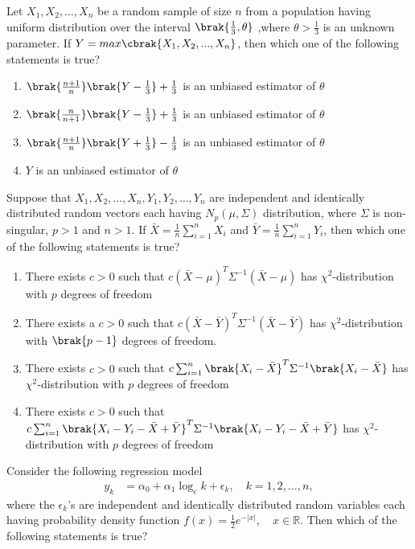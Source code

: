 \item Let $X_1, X_2, \ldots, X_n$ be a random sample of size $n$ from a population having uniform distribution over the interval $\brak{\frac{1}{3},\theta}$ ,where $\theta > \frac{1}{3}$ is an unknown parameter. If $Y = max\cbrak{X_1,X_2,...,X_n}$, then which one of the following statements is true?

\begin{enumerate}
    \item $\brak{\frac{n+1}{n}}\brak{Y-\frac{1}{3}} + \frac{1}{3}$ is an unbiased estimator of $\theta$
    \item $\brak{\frac{n}{n+1}}\brak{Y-\frac{1}{3}} + \frac{1}{3}$ is an unbiased estimator of $\theta$
    \item $\brak{\frac{n+1}{n}}\brak{Y+\frac{1}{3}} - \frac{1}{3}$ is an unbiased estimator of $\theta$
    \item $Y$ is an unbiased estimator of $\theta$
\end{enumerate}

\item Suppose that $X_1, X_2, \ldots, X_n,Y_1, Y_2, \ldots, Y_n$ are independent and identically distributed random vectors each having $N_p(\mu, \Sigma)$ distribution, where $\Sigma$ is non-singular, $p > 1$ and $n>1$. If $\bar{X} = \frac{1}{n} \sum_{i=1}^{n} X_i$ and $\bar{Y} = \frac{1}{n} \sum_{i=1}^{n} Y_i$, then which one of the following statements is true?

\begin{enumerate}
    \item There exists $c > 0$ such that $c (\bar{X} - \mu)^T \Sigma^{-1} (\bar{X} - \mu)$ has $\chi^2$-distribution with $p$ degrees of freedom
    \item There exists a $c > 0$ such that $c (\bar{X} - \bar{Y})^T \Sigma^{-1} (\bar{X} - \bar{Y})$ has $\chi^2$-distribution with $\brak{p-1}$ degrees of freedom.
    \item There exists $c > 0$ such that $c \sum_{i=1}^{n} \brak{X_i - \bar{X}}^T \Sigma^{-1} \brak{X_i - \bar{X}} $ has $\chi^2$-distribution with $p$ degrees of freedom
    \item There exists $c > 0$ such that $c \sum_{i=1}^{n} \brak{X_i - Y_i - \bar{X}+\bar{Y}}^T \Sigma^{-1}  \brak{X_i - Y_i - \bar{X}+\bar{Y}}$ has $\chi^2$-distribution with $p$ degrees of freedom
\end{enumerate}

\item Consider the following regression model
\begin{align*}
y_k &= \alpha_0 + \alpha_1 \log_e k + \epsilon_k, \quad k = 1, 2, \dots, n,
\end{align*}
where the $ \epsilon_k $'s are independent and identically distributed random variables each having probability density function $f(x) = \frac{1}{2}e^{-|x|}, \quad x \in \mathbb{R}$.
Then which of the following statements is true?

